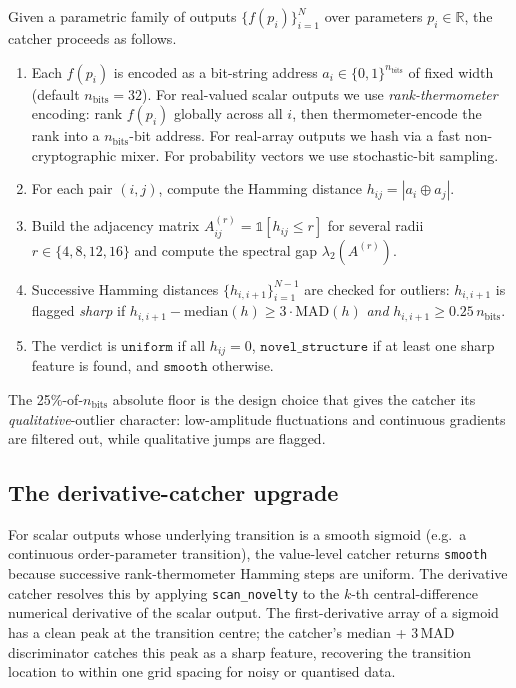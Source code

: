 \documentclass[11pt,letterpaper]{article}
\begin{document}
Given a parametric family of outputs $\{f(p_i)\}_{i=1}^N$ over parameters $p_i \in \mathbb{R}$, the catcher proceeds as follows.

\begin{enumerate}[leftmargin=*,itemsep=0pt]
\item Each $f(p_i)$ is encoded as a bit-string address $a_i \in \{0,1\}^{n_{\mathrm{bits}}}$ of fixed width (default $n_{\mathrm{bits}} = 32$). For real-valued scalar outputs we use \emph{rank-thermometer} encoding: rank $f(p_i)$ globally across all $i$, then thermometer-encode the rank into a $n_{\mathrm{bits}}$-bit address. For real-array outputs we hash via a fast non-cryptographic mixer. For probability vectors we use stochastic-bit sampling.
\item For each pair $(i,j)$, compute the Hamming distance $h_{ij} = |a_i \oplus a_j|$.
\item Build the adjacency matrix $A^{(r)}_{ij} = \mathbb{1}[h_{ij} \le r]$ for several radii $r \in \{4, 8, 12, 16\}$ and compute the spectral gap $\lambda_2(A^{(r)})$.
\item Successive Hamming distances $\{h_{i,i+1}\}_{i=1}^{N-1}$ are checked for outliers: $h_{i,i+1}$ is flagged \emph{sharp} if $h_{i,i+1} - \mathrm{median}(h) \ge 3 \cdot \mathrm{MAD}(h)$ \emph{and} $h_{i,i+1} \ge 0.25\, n_{\mathrm{bits}}$.
\item The verdict is $\mathtt{uniform}$ if all $h_{ij} = 0$, $\mathtt{novel\_structure}$ if at least one sharp feature is found, and $\mathtt{smooth}$ otherwise.
\end{enumerate}

The 25\%-of-$n_{\mathrm{bits}}$ absolute floor is the design choice that gives the catcher its \emph{qualitative}-outlier character: low-amplitude fluctuations and continuous gradients are filtered out, while qualitative jumps are flagged.

\subsection{The derivative-catcher upgrade}\label{ssec:derivative}

For scalar outputs whose underlying transition is a smooth sigmoid (e.g.\ a continuous order-parameter transition), the value-level catcher returns \texttt{smooth} because successive rank-thermometer Hamming steps are uniform. The derivative catcher resolves this by applying \texttt{scan\_novelty} to the $k$-th central-difference numerical derivative of the scalar output. The first-derivative array of a sigmoid has a clean peak at the transition centre; the catcher's median + 3\,MAD discriminator catches this peak as a sharp feature, recovering the transition location to within one grid spacing for noisy or quantised data.
\end{document}
